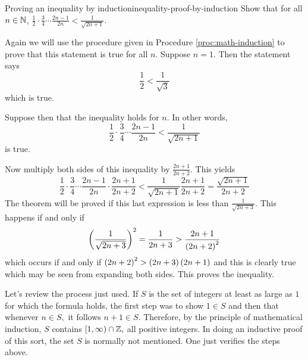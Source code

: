 \begin{example}{Proving an inequality by induction}{inequality-proof-by-induction}
Show that for all $n\in \mathbb{N}$, $\displaystyle \frac{1}{2}\cdot 
\displaystyle \frac{3}{4}\cdots \displaystyle \frac{2n-1}{2n}<\displaystyle
\frac{1}{\sqrt{2n+1}}.$
\end{example}

\begin{solution}
Again we will use the procedure given in Procedure \ref{proc:math-induction} to prove that this statement is true for all $n$.
Suppose $n=1$. Then the statement says 
\begin{equation*}
\frac{1}{2}< \frac{1}{\sqrt{3}}
\end{equation*}
 which is true. 

Suppose then that
the inequality holds for $n.$ In other words, 
\begin{equation*}
 \frac{1}{2}\cdot \frac{3}{4}\cdots \frac{2n-1}{2n} < \frac{1}{\sqrt{2n+1}}
\end{equation*}
is true.

Now multiply both sides of this inequality by $\frac{2n+1}{2n+2}$.
This yields
\begin{equation*}
\frac{1}{2}\cdot \frac{3}{4}\cdots \frac{2n-1}{2n}\cdot \frac{2n+1}{2n+2}<
\frac{1}{\sqrt{2n+1}}\frac{2n+1}{2n+2}=\frac{\sqrt{2n+1}}{2n+2}
\end{equation*}
The theorem will be proved if this last expression is less than $
\displaystyle\frac{1}{\sqrt{2n+3}}.$ This happens if and only if
\begin{equation*}
\left(\frac{1}{\sqrt{2n+3}}\right) ^{2}=\frac{1}{2n+3}>\frac{2n+1}{\left(
2n+2\right) ^{2}}
\end{equation*}
which occurs if and only if $\left(2n+2\right) ^{2}>\left(2n+3\right)
\left(2n+1\right) $ and this is clearly true which may be seen from
expanding both sides. This proves the inequality.
\end{solution}

Let's review the process just used. If $S$ is the set of integers at least as
large as $1$ for which the formula holds, the first step was to show $1\in S$
and then that whenever $n\in S,$ it follows $n+1\in S.$ Therefore, by the
principle of mathematical induction, $S$ contains $[1,\infty )\cap \mathbb{Z}
,$ all positive integers. In doing an inductive proof of this sort, the set $
S$ is normally not mentioned. One just verifies the steps above. 
